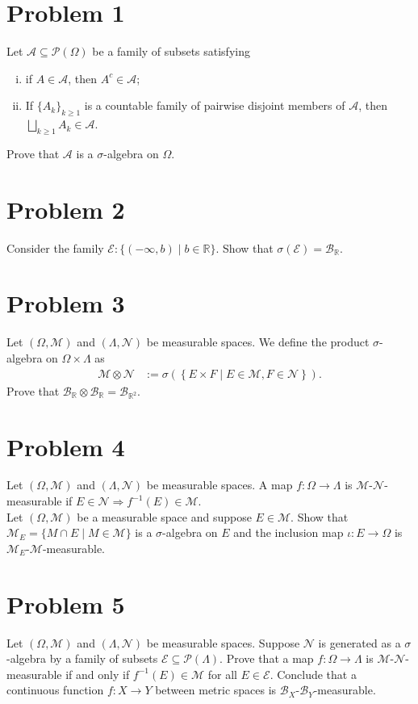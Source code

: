 \documentclass[10pt]{extarticle}
\title{}
\author{}
\date{}
\newcommand{\R}{\mathbb{R}}
\begin{document}
  \section{Problem 1}%
  Let $\mathcal{A}\subseteq \mathcal{P}(\Omega)$ be a family of subsets satisfying
  \begin{enumerate}[(i)]
    \item if $A\in \mathcal{A}$, then $A^{c}\in \mathcal{A}$;
    \item If $\{A_k\}_{k\geq 1}$ is a countable family of pairwise disjoint members of $\mathcal{A}$, then $\bigsqcup_{k\geq 1}A_k \in \mathcal{A}$.
  \end{enumerate}
  Prove that $\mathcal{A}$ is a $\sigma$-algebra on $\Omega$.
  \section{Problem 2}%
  Consider the family $\mathcal{E}: \{(-\infty,b)\mid b\in\R\}$. Show that $\sigma(\mathcal{E}) = \mathcal{B}_{\R}$.
  \section{Problem 3}%
  Let $(\Omega,\mathcal{M})$ and $(\Lambda,\mathcal{N})$ be measurable spaces. We define the product $\sigma$-algebra on $\Omega \times \Lambda$ as
  \begin{align*}
    \mathcal{M}\otimes \mathcal{N} &:= \sigma\left(\left\{E\times F\mid E\in\mathcal{M},F\in\mathcal{N}\right\}\right).
  \end{align*}
  Prove that $\mathcal{B}_{\R}\otimes \mathcal{B}_{\R} = \mathcal{B}_{\R^2}$.
  \section{Problem 4}%
  Let $(\Omega,\mathcal{M})$ and $(\Lambda,\mathcal{N})$ be measurable spaces. A map $f: \Omega \rightarrow \Lambda$ is $\mathcal{M}$-$\mathcal{N}$-measurable if $E\in\mathcal{N}\Rightarrow f^{-1}(E)\in \mathcal{M}$.\\

  Let $(\Omega,\mathcal{M})$ be a measurable space and suppose $E\in\mathcal{M}$. Show that $\mathcal{M}_{E} = \{M\cap E\mid M\in\mathcal{M}\}$ is a $\sigma$-algebra on $E$ and the inclusion map $\iota: E\rightarrow \Omega$ is $\mathcal{M}_{E}$-$\mathcal{M}$-measurable.
  \section{Problem 5}%
  Let $(\Omega,\mathcal{M})$ and $(\Lambda,\mathcal{N})$ be measurable spaces. Suppose $\mathcal{N}$ is generated as a $\sigma$-algebra by a family of subsets $\mathcal{E}\subseteq \mathcal{P}(\Lambda)$. Prove that a map $f:\Omega \rightarrow \Lambda$ is $\mathcal{M}$-$\mathcal{N}$-measurable if and only if $f^{-1}(E)\in \mathcal{M}$ for all $E\in \mathcal{E}$. Conclude that a continuous function $f: X\rightarrow Y$ between metric spaces is $\mathcal{B}_{X}$-$\mathcal{B}_{Y}$-measurable.
\end{document}
